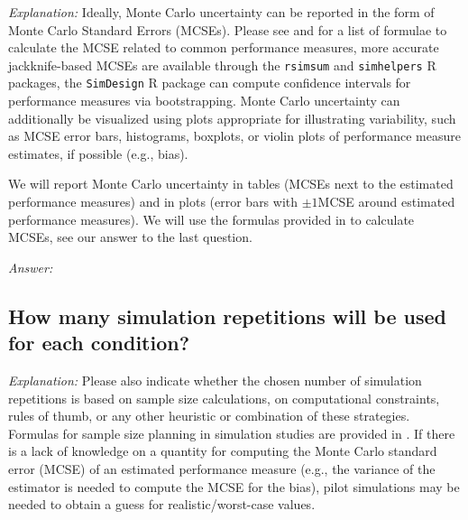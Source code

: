 \documentclass[12pt]{article}
\begin{document}
\textit{Explanation:} Ideally, Monte Carlo uncertainty can be reported in the form of Monte Carlo Standard Errors (MCSEs). Please see \textcite{Siepe2023} and \textcite{Morris2019} for a list of formulae to calculate the MCSE related to common performance measures, more accurate jackknife-based MCSEs are available through the \texttt{rsimsum} \parencite{Gasparini2018} and \texttt{simhelpers} \parencite{Simhelpers2022} R packages, the \texttt{SimDesign} \parencite{Chalmers2020} R package can compute confidence intervals for performance measures via bootstrapping. Monte Carlo uncertainty can additionally be visualized using plots appropriate for illustrating variability, such as MCSE error bars, histograms, boxplots, or violin plots of performance measure estimates, if possible (e.g., bias).

\begin{examplebox}
We will report Monte Carlo uncertainty in tables (MCSEs next to the estimated performance measures) and in plots (error bars with $\pm 1$MCSE around estimated performance measures). We will use the formulas provided in \textcite{Siepe2023} to calculate MCSEs, see our answer to the last question.
\end{examplebox}

\textit{Answer:}

\subsection{How many simulation repetitions will be used for each condition?}

\textit{Explanation:} Please also indicate whether the chosen number of simulation repetitions is based on sample size calculations, on computational constraints, rules of thumb, or any other heuristic or combination of these strategies. Formulas for sample size planning in simulation studies are provided in \textcite{Siepe2023}. If there is a lack of knowledge on a quantity for computing the Monte Carlo standard error (MCSE) of an estimated performance measure (e.g., the variance of the estimator is needed to compute the MCSE for the bias), pilot simulations may be needed to obtain a guess for realistic/worst-case values.
\end{document}
